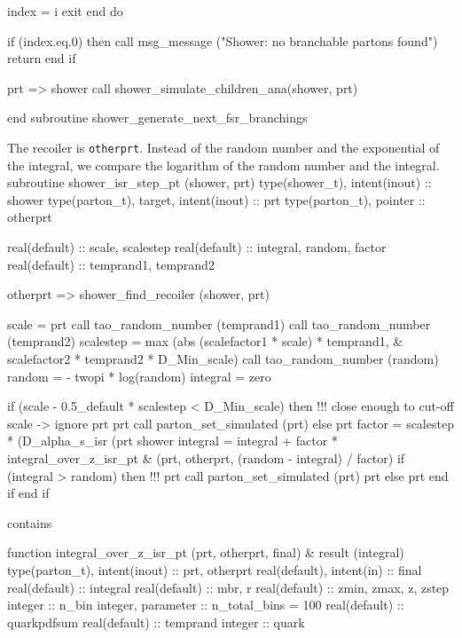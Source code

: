          index = i
         exit
      end do

      if (index.eq.0) then
         call msg_message ("Shower: no branchable partons found")
         return
      end if

      prt => shower%
      call shower_simulate_children_ana(shower, prt)

    end subroutine shower_generate_next_fsr_branchings

\eatline
\nwendcode{}The recoiler is {\tt{}otherprt}. Instead of the random number and the
exponential of the integral, we compare the logarithm of the random
number and the integral.
\nwenddocs{}\plusendmoddef
  subroutine shower_isr_step_pt (shower, prt)
    type(shower_t), intent(inout) :: shower
    type(parton_t), target, intent(inout) :: prt
    type(parton_t), pointer :: otherprt

    real(default) :: scale, scalestep
    real(default) :: integral, random, factor
    real(default) :: temprand1, temprand2

    otherprt => shower_find_recoiler (shower, prt)

    scale = prt%
    call tao_random_number (temprand1)
    call tao_random_number (temprand2)
    scalestep = max (abs (scalefactor1 * scale) * temprand1, &
         scalefactor2 * temprand2 * D_Min_scale)
    call tao_random_number (random)
    random = - twopi * log(random)
    integral = zero

    if (scale - 0.5_default * scalestep < D_Min_scale) then
       !!! close enough to cut-off scale -> ignore
       prt%
       prt%
       call parton_set_simulated (prt)
    else
       prt%
       factor = scalestep * (D_alpha_s_isr (prt%
            shower%
       integral = integral + factor * integral_over_z_isr_pt &
            (prt, otherprt, (random - integral) / factor)
       if (integral > random) then
          !!! prt%
          call parton_set_simulated (prt)
          prt%
       else
          prt%
       end if
    end if

  contains

    function integral_over_z_isr_pt (prt, otherprt, final) &
         result (integral)
      type(parton_t), intent(inout) :: prt, otherprt
      real(default), intent(in) :: final
      real(default) :: integral
      real(default) :: mbr, r
      real(default) :: zmin, zmax, z, zstep
      integer :: n_bin
      integer, parameter :: n_total_bins = 100
      real(default) :: quarkpdfsum
      real(default) :: temprand
      integer :: quark

